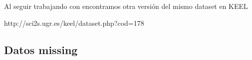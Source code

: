 \ABIERTO
Al seguir trabajando con \mushroom encontramos otra versión del mismo dataset en KEEL

http://sci2s.ugr.es/keel/dataset.php?cod=178






\subsection{Datos missing}
\label{sec:clasificacion:catalogo-completo:datos-missing}
